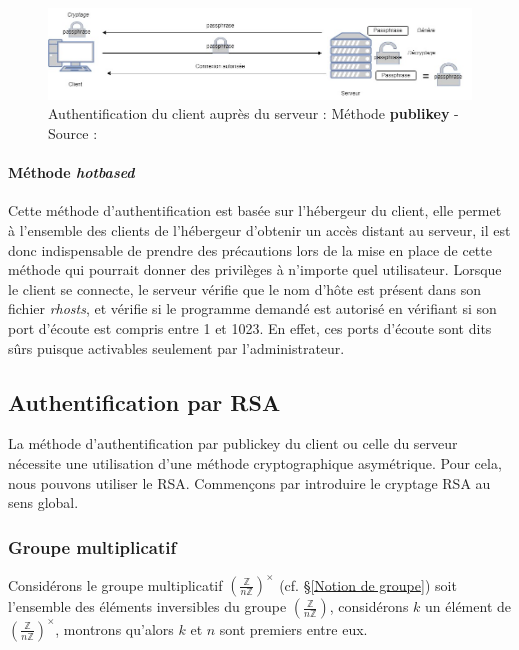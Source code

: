 \begin{figure}[H]
    \centering
    \includegraphics[width=1\linewidth]{images/PublicKey_Aiuthentification_Method.jpg}
    \caption{Authentification du client auprès du serveur : Méthode \textbf{publikey} - Source : \cite{cadegros_authentification_2023}}
    \label{fig:enter-label}
\end{figure}

\paragraph{Méthode \textit{hotbased}}
Cette méthode d'authentification est basée sur l'hébergeur du client, elle permet à l'ensemble des clients de l'hébergeur d'obtenir un accès distant au serveur, il est donc indispensable de prendre des précautions lors de la mise en place de cette méthode qui pourrait donner des privilèges à n'importe quel utilisateur. Lorsque le client se connecte, le serveur vérifie que le nom d'hôte est présent dans son fichier \textit{rhosts}, et vérifie si le programme demandé est autorisé en vérifiant si son port d'écoute est compris entre 1 et 1023. En effet, ces ports d'écoute sont dits sûrs puisque activables seulement par l'administrateur.\cite{hajjeh_ibrahim_protocole_2006}

\subsection{Authentification par RSA}

La méthode d'authentification par publickey du client ou celle du serveur nécessite une utilisation d'une méthode cryptographique asymétrique. Pour cela, nous pouvons utiliser le RSA. Commençons par introduire le cryptage RSA au sens global.

\subsubsection{Groupe multiplicatif}

Considérons le groupe multiplicatif $(\frac{\mathbb{Z}}{n\mathbb{Z}})^{\times}$ (cf. §\ref{Notion de groupe}) soit l'ensemble des éléments inversibles du groupe $(\frac{\mathbb{Z}}{n\mathbb{Z}})$, considérons $k$ un élément de $(\frac{\mathbb{Z}}{n\mathbb{Z}})^{\times}$, montrons qu'alors $k$ et $n$ sont premiers entre eux.\\

